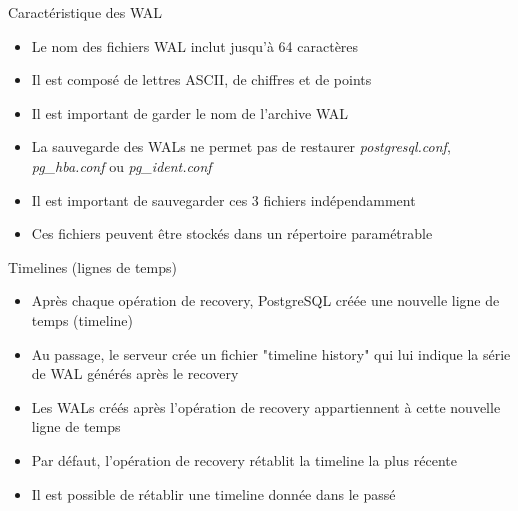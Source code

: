 
\begin{frame}[fragile]{Caractéristique des WAL}

\begin{itemize}

   \item Le nom des fichiers WAL inclut jusqu'à 64 caractères
   \item Il est composé de lettres ASCII, de chiffres et de points
   \item Il est important de garder le nom de l'archive WAL
   \item La sauvegarde des WALs ne permet pas de restaurer \textit{postgresql.conf}, \textit{pg\_hba.conf} ou \textit{pg\_ident.conf}
   \item Il est important de sauvegarder ces 3 fichiers indépendamment
   \item Ces fichiers peuvent être stockés dans un répertoire paramétrable

\end{itemize}

\end{frame}


\begin{frame}[fragile]{Timelines (lignes de temps)}

\begin{itemize}

   \item Après chaque opération de recovery, PostgreSQL créée une nouvelle ligne de temps (timeline)
   \item Au passage, le serveur crée un fichier "timeline history" qui lui indique la série de WAL générés après le recovery
   \item Les WALs créés après l'opération de recovery appartiennent à cette nouvelle ligne de temps
   \item Par défaut, l'opération de recovery rétablit la timeline la plus récente
   \item Il est possible de rétablir une timeline donnée dans le passé


\end{itemize}

\begin{toile}
\end{toile}

\end{frame}


